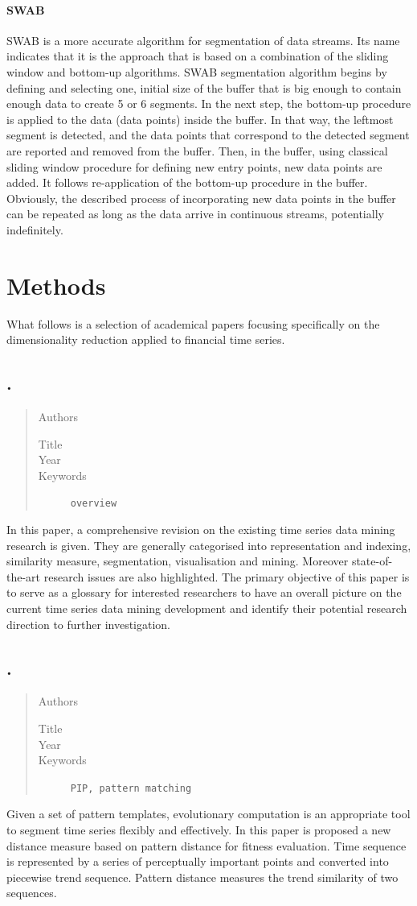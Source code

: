 \documentclass[a4paper]{article}
\newcommand{\newpaper}[2]{\subsection*{\cite{#1}. \citetitle{#1}}

\begin{framed}\begin{quote}\begin{description}
	\item [Authors]\citeauthor{#1}
	\item [Title]\citetitle{#1}
	\item [Year]\citedate{#1}
	\item [Keywords]\texttt{#2}
\end{description}\end{quote}\end{framed}

}
\begin{document}
\paragraph{SWAB} SWAB is a more accurate algorithm for segmentation of data streams. Its name indicates that it is the approach that is based on a combination of the sliding window and bottom-up algorithms. SWAB segmentation algorithm begins by defining and selecting one, initial size of the buffer that is big enough to contain enough data to create 5 or 6 segments. In the next step, the bottom-up procedure is applied to the data (data points) inside the buffer. In that way, the leftmost segment is detected, and the data points that correspond to the detected segment are reported and removed from the buffer. Then, in the buffer, using classical sliding window procedure for defining new entry points, new data points are added. It follows re-application of the bottom-up procedure in the buffer. Obviously, the described process of incorporating new data points in the buffer can be repeated as long as the data arrive in continuous streams, potentially indefinitely. 





\section{Methods}\label{sec:methods}
 
What follows is a selection of academical papers focusing specifically on the dimensionality reduction applied to financial time series. 


\newpaper{Fu2011164}{overview}
In this paper, a comprehensive revision on the existing time series data mining research is given. They are generally categorised into representation and indexing, similarity measure, segmentation, visualisation and mining. Moreover state-of-the-art research issues are also highlighted. The primary objective of this paper is to serve as a glossary for interested researchers to have an overall picture on the current time series data mining development and identify their potential research direction to further investigation. 


\newpaper{Yu2006}{PIP, pattern matching} 

Given a set of pattern templates, evolutionary computation is an appropriate tool to segment time series flexibly and effectively. In this paper is proposed a new distance measure based on pattern distance for fitness evaluation. Time sequence is represented by a series of perceptually important points and converted into piecewise trend sequence. Pattern distance measures the trend similarity of two sequences.
\end{document}

